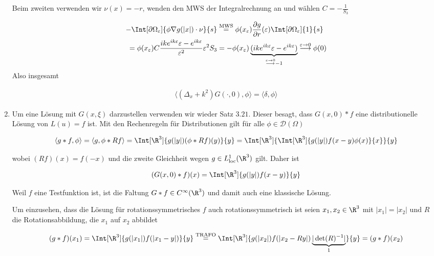 \begin{solution}
\begin{enumerate}[label = (\roman*)]
Beim zweiten verwenden wir $\nu(x) = - r$, wenden den MWS der Integralrechnung an und wählen $C = -\frac{1}{S_3}$

\begin{align*}
  - \Int[\partial \Omega_\varepsilon]{\phi \nabla g(|x|) \cdot \nu}{s}
  &\stackrel{\text{MWS}}{=}
  \phi(x_\varepsilon) \frac{\partial g}{\partial r}(\varepsilon) \Int[\partial \Omega_\varepsilon]{1}{s} \\
  =
  \phi(x_\varepsilon) C \frac{ik e^{ik\varepsilon}\varepsilon - e^{ik\varepsilon}}{\varepsilon^2} \varepsilon^2 S_3
  &=
  -\phi(x_\varepsilon) \underbrace{(ik e^{ik\varepsilon}\varepsilon - e^{ik\varepsilon})}_{\stackrel{\varepsilon \to 0}{\longrightarrow} -1}
  \stackrel{\varepsilon \to 0}{\longrightarrow}
  \phi(0)
\end{align*}
Also insgesamt

\begin{align*}
  \langle (\Delta_x + k^2)G(\cdot, 0), \phi \rangle
  =
  \langle \delta, \phi \rangle
\end{align*}

\item Um eine Lösung mit $G(x,\xi)$ darzustellen verwenden wir wieder Satz $3.21$. Dieser besagt, dass
$G(x,0) \ast f$ eine distributionelle Lösung von $L(u) = f$ ist. Mit den Rechenregeln für Distributionen gilt für alle $\phi \in \mathcal{D}(\Omega)$

\begin{align*}
  \langle g \ast f, \phi \rangle
  =
  \langle g, \phi \ast Rf \rangle
  =
  \Int[\R^3]{g(|y|)(\phi \ast Rf)(y)}{y}
  =
  \Int[\R^3]{
    \Int[\R^3]{g(|y|) f(x-y) \phi(x)}{x}
    }{y}
\end{align*}

wobei $(Rf)(x) = f(-x)$ und die zweite Gleichheit wegen $g \in L^1_{\mathrm{loc}}(\R^3)$ gilt. Daher ist

\begin{align*}
  (G(x,0) \ast f)(x)
  =
  \Int[\R^3]{g(|y|) f(x-y)}{y}
\end{align*}

Weil $f$ eine Testfunktion ist, ist die Faltung $G \ast f \in C^{\infty}(\R^3)$ und damit auch eine klassische Lösung.

Um einzusehen, dass die Lösung für rotationssymmetrisches $f$ auch rotationssymmetrisch ist seien $x_1, x_2 \in \R^3$ mit
$|x_1| = |x_2|$ und $R$ die Rotationsabbildung, die $x_1$ auf $x_2$ abbildet

\begin{align*}
  (g \ast f)(x_1)
  =
  \Int[\R^3]{g(|x_1|) f(|x_1 - y|)}{y}
  \stackrel{\text{TRAFO}}{=}
  \Int[\R^3]{g(|x_2|) f(|x_2 - Ry|) \underbrace{|\det(R)^{-1}|}_1}{y}
  =
  (g \ast f)(x_2)
\end{align*}


\end{enumerate}
\end{solution}
